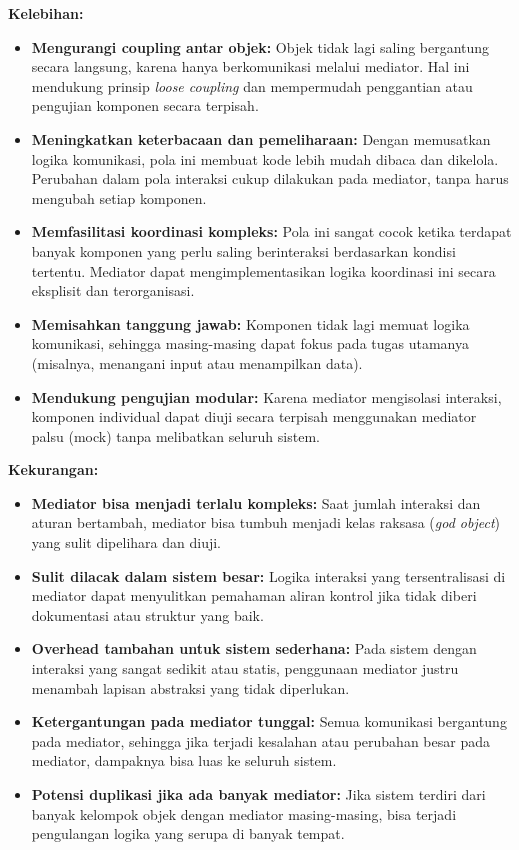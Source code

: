 \textbf{Kelebihan:}
\begin{itemize}
	\item \textbf{Mengurangi coupling antar objek:} Objek tidak lagi saling bergantung secara langsung, karena hanya berkomunikasi melalui mediator. Hal ini mendukung prinsip \textit{loose coupling} dan mempermudah penggantian atau pengujian komponen secara terpisah.
	
	\item \textbf{Meningkatkan keterbacaan dan pemeliharaan:} Dengan memusatkan logika komunikasi, pola ini membuat kode lebih mudah dibaca dan dikelola. Perubahan dalam pola interaksi cukup dilakukan pada mediator, tanpa harus mengubah setiap komponen.
	
	\item \textbf{Memfasilitasi koordinasi kompleks:} Pola ini sangat cocok ketika terdapat banyak komponen yang perlu saling berinteraksi berdasarkan kondisi tertentu. Mediator dapat mengimplementasikan logika koordinasi ini secara eksplisit dan terorganisasi.
	
	\item \textbf{Memisahkan tanggung jawab:} Komponen tidak lagi memuat logika komunikasi, sehingga masing-masing dapat fokus pada tugas utamanya (misalnya, menangani input atau menampilkan data).
	
	\item \textbf{Mendukung pengujian modular:} Karena mediator mengisolasi interaksi, komponen individual dapat diuji secara terpisah menggunakan mediator palsu (mock) tanpa melibatkan seluruh sistem.
\end{itemize}

\textbf{Kekurangan:}
\begin{itemize}
	\item \textbf{Mediator bisa menjadi terlalu kompleks:} Saat jumlah interaksi dan aturan bertambah, mediator bisa tumbuh menjadi kelas raksasa (\textit{god object}) yang sulit dipelihara dan diuji.
	
	\item \textbf{Sulit dilacak dalam sistem besar:} Logika interaksi yang tersentralisasi di mediator dapat menyulitkan pemahaman aliran kontrol jika tidak diberi dokumentasi atau struktur yang baik.
	
	\item \textbf{Overhead tambahan untuk sistem sederhana:} Pada sistem dengan interaksi yang sangat sedikit atau statis, penggunaan mediator justru menambah lapisan abstraksi yang tidak diperlukan.
	
	\item \textbf{Ketergantungan pada mediator tunggal:} Semua komunikasi bergantung pada mediator, sehingga jika terjadi kesalahan atau perubahan besar pada mediator, dampaknya bisa luas ke seluruh sistem.
	
	\item \textbf{Potensi duplikasi jika ada banyak mediator:} Jika sistem terdiri dari banyak kelompok objek dengan mediator masing-masing, bisa terjadi pengulangan logika yang serupa di banyak tempat.
\end{itemize}

